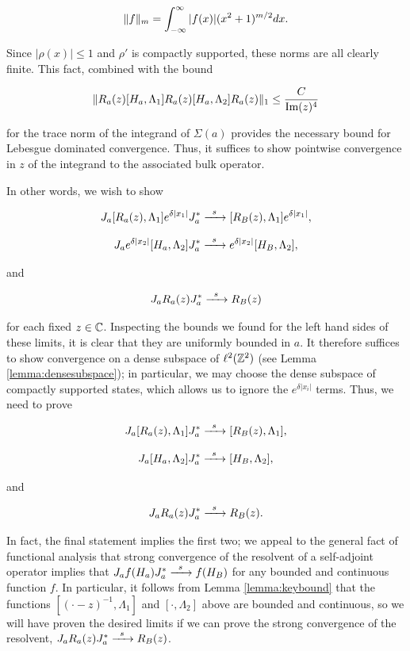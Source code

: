 \documentclass[12pt, letterpaper]{article}
\begin{document}
\[\lVert f \rVert_{m} = \int_{-\infty}^\infty |f(x)|(x^2+1)^{m/2}dx.\]

Since $|\rho(x)|\leq 1$ and $\rho'$ is compactly supported, these norms are all clearly finite. This fact, combined with the bound 

\[\lVert R_a(z)[H_a,\Lambda_1]R_a(z)[H_a,\Lambda_2]R_a(z) \rVert_1 \leq \frac{C}{\text{Im}(z)^4}\]

for the trace norm of the integrand of $\Sigma(a)$ provides the necessary bound for Lebesgue dominated convergence. Thus, it suffices to show pointwise convergence in $z$ of the integrand to the associated bulk operator. 

In other words, we wish to show 

\[ J_a[R_a(z),\Lambda_1]e^{\delta|x_1|}J_a^* \xrightarrow{\enskip s \enskip} [R_B(z), \Lambda_1]e^{\delta|x_1|},\]

\[J_ae^{\delta|x_2|}[H_a,\Lambda_2]J_a^* \xrightarrow{\enskip s \enskip} e^{\delta|x_2|}[H_B, \Lambda_2],\]

and 

\[J_aR_a(z)J_a^* \xrightarrow{\enskip s \enskip} R_B(z)\]

for each fixed $z\in\mathbb{C}$. Inspecting the bounds we found for the left hand sides of these limits, it is clear that they are uniformly bounded in $a$. It therefore suffices to show convergence on a dense subspace of $\ell^2(\mathbb{Z}^2)$ (see Lemma \ref{lemma:densesubspace}); in particular, we may choose the dense subspace of compactly supported states, which allows us to ignore the $e^{\delta|x_i|}$ terms. Thus, we need to prove 

\[ J_a[R_a(z),\Lambda_1]J_a^* \xrightarrow{\enskip s \enskip} [R_B(z), \Lambda_1],\]

\[J_a [H_a,\Lambda_2]J_a^* \xrightarrow{\enskip s \enskip} [H_B, \Lambda_2],\]

and 

\[J_aR_a(z)J_a^* \xrightarrow{\enskip s \enskip} R_B(z).\]

In fact, the final statement implies the first two; we appeal to the general fact of functional analysis that strong convergence of the resolvent of a self-adjoint operator implies that $J_a f(H_a) J_a^* \xrightarrow{\enskip s \enskip} f(H_B)$ for any bounded and continuous function $f$. In particular, it follows from Lemma \ref{lemma:keybound} that the functions $[(\cdot - z)^{-1}, \Lambda_1]$ and $[\cdot, \Lambda_2]$ above are bounded and continuous, so we will have proven the desired limits if we can prove the strong convergence of the resolvent, $J_aR_a(z)J_a^* \xrightarrow{\enskip s \enskip} R_B(z)$.
\end{document}
